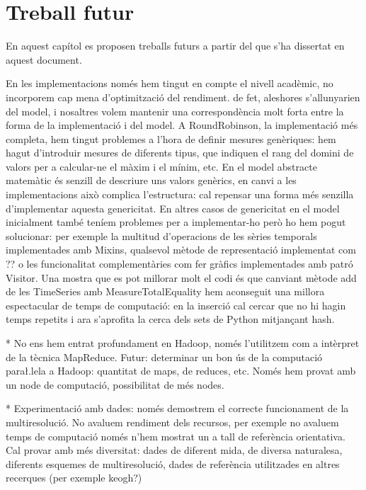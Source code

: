 \chapter{Treball futur}
\label{sec:futur}


En aquest capítol es proposen treballs futurs a partir del que s'ha  dissertat en aquest document.




En les implementacions només hem tingut en compte el nivell acadèmic,
no incorporem cap mena d'optimització del rendiment. de fet, aleshores
s'allunyarien del model, i nosaltres volem mantenir una
correspondència molt forta entre la forma de la implementació i del
model.  A RoundRobinson, la implementació més completa, hem tingut
problemes a l'hora de definir mesures genèriques: hem hagut
d'introduir mesures de diferents tipus, que indiquen el rang del
domini de valors per a calcular-ne el màxim i el mínim, etc. En el
model abstracte matemàtic és senzill de descriure uns valors genèrics,
en canvi a les implementacions això complica l'estructura: cal
repensar una forma més senzilla d'implementar aquesta genericitat. En
altres casos de genericitat en el model inicialment també teníem
problemes per a implementar-ho però ho hem pogut solucionar: per
exemple la multitud d'operacions de les sèries temporals implementades
amb Mixins, qualsevol mètode de representació implementat com ?? o les
funcionalitat complementàries com fer gràfics implementades amb patró
Visitor.  Una mostra que es pot millorar molt el codi és que canviant
mètode add de les TimeSeries amb MeasureTotalEquality hem aconseguit
una millora espectacular de temps de computació: en la inserció cal
cercar que no hi hagin temps repetits i ara s'aprofita la cerca dels
sets de Python mitjançant hash.


* No ens hem entrat profundament en Hadoop, només l'utilitzem com a intèrpret de la tècnica MapReduce. Futur: determinar un bon ús de la computació para\l.lela a Hadoop: quantitat de maps, de reduces, etc. Només hem provat amb un node de computació, possibilitat de més nodes.



* Experimentació amb dades: només demostrem el correcte funcionament de la multiresolució. No avaluem rendiment dels recursos, per exemple no avaluem temps de computació només n'hem mostrat un a tall de referència orientativa.  Cal provar amb més diversitat: dades de diferent mida, de diversa naturalesa, diferents esquemes de multiresolució, dades de referència utilitzades en altres recerques (per exemple keogh?)

